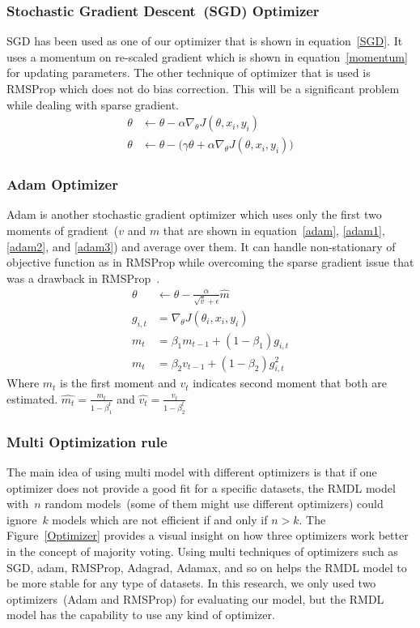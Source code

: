 \documentclass[sigconf, final]{acmart}
\begin{document}
\subsubsection{Stochastic Gradient Descent~(SGD) Optimizer}
SGD has been used as one of our optimizer that is shown in equation~\ref{SGD}. It uses a momentum on re-scaled gradient which is shown in equation~\ref{momentum} for updating parameters. The other technique of optimizer that is used is RMSProp which does not do bias correction. This will be a significant problem while dealing with sparse gradient. 
\begin{align}
\label{SGD}
\theta &\leftarrow \theta - \alpha \nabla_\theta J(\theta , x_i,y_i)\\
\label{momentum}
\theta &\leftarrow \theta -\big( \gamma \theta + \alpha \nabla_\theta J(\theta , x_i,y_i)\big)
\end{align}\subsubsection{Adam Optimizer}
Adam is another stochastic gradient optimizer which uses only the first two moments of gradient~($v$ and $m$ that are shown in equation~\ref{adam},   \ref{adam1}, \ref{adam2}, and \ref{adam3}) and average over them. It can handle non-stationary of objective function as in RMSProp while overcoming the sparse gradient issue that was a drawback in RMSProp~\cite{kingma2014adam}.
\begin{align}
\label{adam}
\theta & \leftarrow \theta - \frac{\alpha}{\sqrt{\hat{v}}+\epsilon} \hat{m}\\
g_{i,t} &=  \nabla_\theta J(\theta_i , x_i,y_i) \label{adam1}\\
\label{adam2}
m_t &= \beta_1 m_{t-1} + (1-\beta_1)g_{i,t}\\
\label{adam3}
m_t &= \beta_2 v_{t-1} + (1-\beta_2)g_{i,t}^2
\end{align}
Where $m_t$ is the first moment and $v_t$ indicates second moment that both are estimated. $\hat{m_t}=\frac{m_t}{1-\beta_1^t}$ and $\hat{v_t}=\frac{v_t}{1-\beta_2^t}$\subsubsection{Multi Optimization rule}
The main idea of using multi model with different optimizers is that if one optimizer does not provide a good fit for a specific datasets, the RMDL model with~$n$ random models~(some of them might use different optimizers) could ignore~$k$ models which are not efficient if and only if $n>k$. The Figure~\ref{Optimizer} provides a visual insight on how three optimizers work better in the concept of majority voting. Using multi techniques of optimizers such as SGD, adam, RMSProp, Adagrad, Adamax, and so on helps the RMDL model to be more stable for any type of datasets. In this research, we only used two optimizers~(Adam and RMSProp) for evaluating our model, but the RMDL model has the capability to use any kind of optimizer.  
\end{document}
